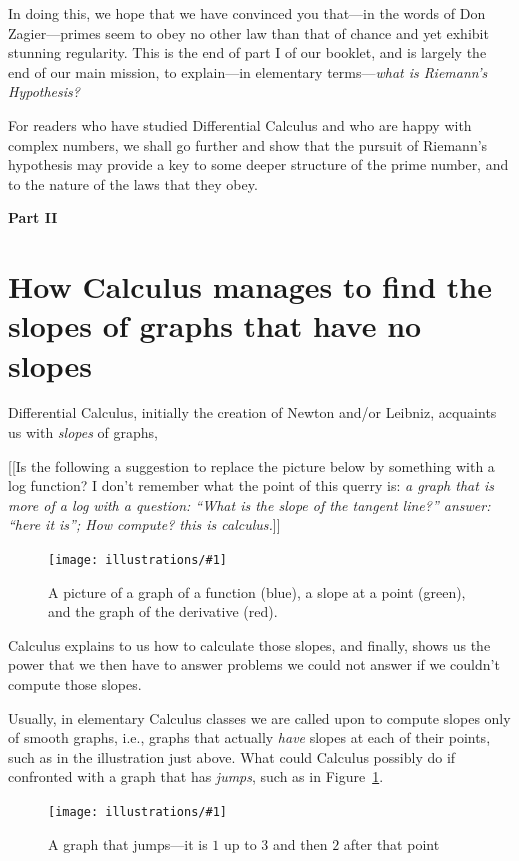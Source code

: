 \documentclass[11pt]{article}
\newcommand{\ill}[3]{ 
   \begin{figure}[htbp]
   \begin{center}
   \texttt{[image: illustrations/\#1]}
   \caption{#3}
   \end{center}
    \end{figure}
}
\theoremstyle{plain}
\theoremstyle{definition}
\numberwithin{equation}{section}
\numberwithin{figure}{section}
\numberwithin{table}{section}
\begin{document}
In doing this, we hope that we have convinced you that---in the words
of Don Zagier---primes seem to obey no other law than that of chance
and yet exhibit stunning regularity.  This is the end of part I of our
booklet, and is largely the end of our main mission, to explain---in
elementary terms---{\em what is Riemann's Hypothesis?}
    
     
For readers who have studied Differential Calculus and who are happy
with complex numbers, we shall go further and show that the pursuit of
Riemann's hypothesis may provide a key to some deeper structure of the
prime number, and to the nature of the laws that they obey.


       
\bigskip   
\bigskip   
\bigskip   
\bigskip   
\centerline{\Large\bf Part II }
    
\bigskip 
\section{How Calculus manages to find the slopes of graphs that  
have no slopes}   
   
Differential Calculus, initially the creation of Newton and/or
Leibniz, acquaints us with {\em slopes} of graphs,
   

[[Is the following a suggestion to replace the picture below by something with a log function?  I don't remember what the point of this querry is: {\em a graph that is more of a log with a question: ``What is the slope
of the tangent line?'' answer: ``here it is''; How compute?  this is
calculus.}]] 
   
   
\ill{graph_slope_deriv}{0.5}{A picture of a graph of a function (blue), a slope at a point (green), and the graph of the derivative (red).}
      
\noindent Calculus explains to us how to calculate those slopes, and
finally, shows us the power that we then have to answer problems we
could not answer if we couldn't compute those slopes.


Usually, in elementary Calculus classes we are called upon to compute
slopes only of smooth graphs, i.e., graphs that actually {\em have}
slopes at each of their points, such as in the illustration just
above.  What could Calculus possibly do if confronted with a graph
that has {\em jumps}, such as in Figure~\ref{fig:jump}.
 
\ill{jump}{0.5}{A graph that jumps---it is $1$ up to $3$ and then $2$ after that point\label{fig:jump}}
  
\end{document}
